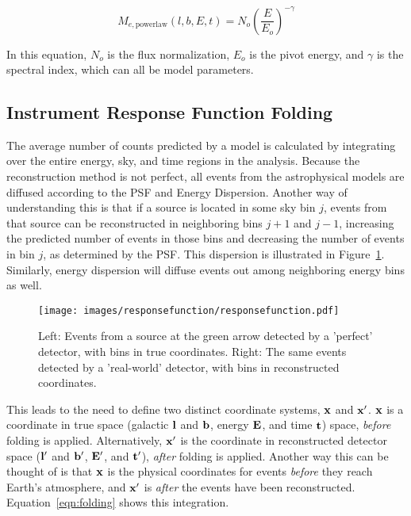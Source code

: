   \begin{equation}\label{eqn:powerlaw_Me}
    M_{e,\textrm{powerlaw}}(l,b,E,t) = N_o \left ( \frac{E}{E_o} \right )^{-\gamma}
  \end{equation}

  In this equation, $N_o$ is the flux normalization, $E_o$ is the pivot energy, and $\gamma$ is the spectral index, which can all be model parameters.

  
  \subsection{Instrument Response Function Folding}\label{subsec:folding}
  The average number of counts predicted by a model is calculated by integrating over the entire energy, sky, and time regions in the analysis.
  Because the reconstruction method is not perfect, all events from the astrophysical models are diffused according to the PSF and Energy Dispersion.
  Another way of understanding this is that if a source is located in some sky bin $j$, events from that source can be reconstructed in neighboring bins $j+1$ and $j-1$, increasing the predicted number of events in those bins and decreasing the number of events in bin $j$, as determined by the PSF.
  This dispersion is illustrated in Figure~\ref{fig:responsedispersion}.
  Similarly, energy dispersion will diffuse events out among neighboring energy bins as well.
  
  \begin{figure}[!t]
    \centering
    \texttt{[image: images/responsefunction/responsefunction.pdf]}
    \caption[Response Function Dispersion]
    {
      Left: Events from a source at the green arrow detected by a 'perfect' detector, with bins in true coordinates.
      Right: The same events detected by a 'real-world' detector, with bins in reconstructed coordinates.
    }
    \label{fig:responsedispersion}
  \end{figure}
  
  This leads to the need to define two distinct coordinate systems, $\mathbf{x }$ and $\mathbf{x'}$.
  $\mathbf{x }$ is a coordinate in true space (galactic $\mathbf{l }$ and $\mathbf{b }$, energy $\mathbf{E }$, and time $\mathbf{t }$) space, \textit{before} folding is applied.
  Alternatively, $\mathbf{x'}$ is the coordinate in reconstructed detector space ($\mathbf{l'}$ and $\mathbf{b'}$, $\mathbf{E'}$, and $\mathbf{t'}$), \textit{after} folding is applied.
  Another way this can be thought of is that $\mathbf{x }$ is the physical coordinates for events \textit{before} they reach Earth's atmosphere, and $\mathbf{x'}$ is \textit{after} the events have been reconstructed.
  Equation~\ref{eqn:folding} shows this integration.
  
